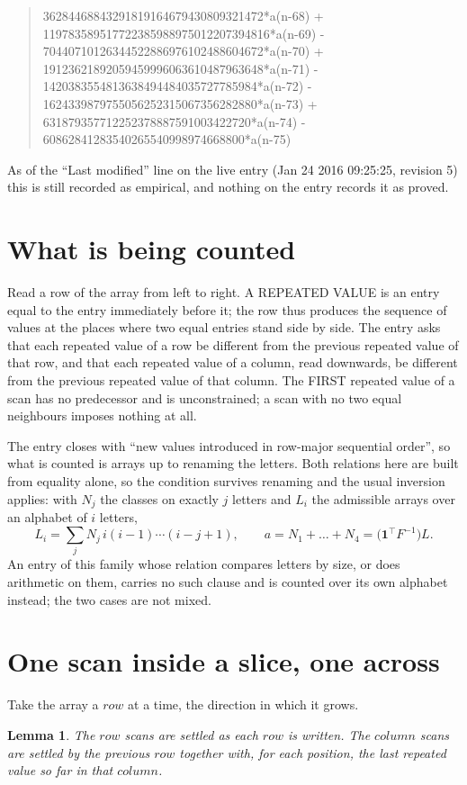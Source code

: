 \documentclass[11pt,a4paper]{article}
\theoremstyle{plain}
\newtheorem{lemma}[theorem]{Lemma}
\theoremstyle{definition}
\begin{document}
\begin{quote}
36284468843291819164679430809321472*a(n-68) + 119783589517722385988975012207394816*a(n-69) - 70440710126344522886976102488604672*a(n-70) + 19123621892059459996063610487963648*a(n-71) - 1420383554813638494484035727785984*a(n-72) - 1624339879755056252315067356282880*a(n-73) + 631879357712252378887591003422720*a(n-74) - 60862841283540265540998974668800*a(n-75)
\end{quote}
As of the ``Last modified'' line on the live entry (Jan 24 2016 09:25:25, revision 5) this is still
recorded as empirical, and nothing on the entry records it as proved.

\section{What is being counted}

Read a row of the array from left to right. A REPEATED VALUE is an entry equal to the entry
immediately before it; the row thus produces the sequence of values at the places where two
equal entries stand side by side. The entry asks that each repeated value of a row be
different from the previous repeated value of that row, and that each repeated value of a column,
read downwards, be different from the previous repeated value of that column. The FIRST repeated
value of a scan has no predecessor and is unconstrained; a scan with no two equal neighbours
imposes nothing at all.

The entry closes with ``new values introduced in row-major sequential order'', so what is
counted is arrays up to renaming the letters. Both relations here are built from equality
alone, so the condition survives renaming and the usual inversion applies: with $N_j$ the
classes on exactly $j$ letters and $L_i$ the admissible arrays over an alphabet of $i$ letters,
\[
L_i=\sum_j N_j\,i(i-1)\cdots(i-j+1),\qquad
a=N_1+\dots+N_{4}=\bigl(\mathbf{1}^{\!\top}F^{-1}\bigr)L .
\]
An entry of this family whose relation compares letters by size, or does arithmetic on them,
carries no such clause and is counted over its own alphabet instead; the two cases are not
mixed.

\section{One scan inside a slice, one across}

Take the array a $row$ at a time, the direction in which it grows.

\begin{lemma}\label{lem:state}
The $row$ scans are settled as each $row$ is written. The $column$ scans are
settled by the previous $row$ together with, for each position, the last repeated value
so far in that $column$.
\end{lemma}
\end{document}
